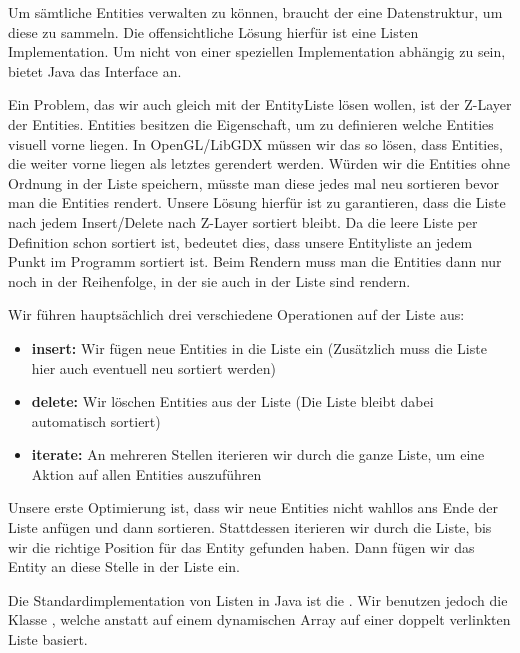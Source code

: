 Um sämtliche Entities verwalten zu können, braucht der  eine Datenstruktur, um diese zu sammeln. Die offensichtliche Lösung hierfür ist eine Listen Implementation. Um nicht von einer speziellen Implementation abhängig zu sein, bietet Java das  Interface an.

Ein Problem, das wir auch gleich mit der EntityListe lösen wollen, ist der Z-Layer der Entities. Entities besitzen die  Eigenschaft, um zu definieren welche Entities visuell vorne liegen. In OpenGL/LibGDX müssen wir das so lösen, dass Entities, die weiter vorne liegen als letztes gerendert werden. Würden wir die Entities ohne Ordnung in der Liste speichern, müsste man diese jedes mal neu sortieren bevor man die Entities rendert. 
Unsere Lösung hierfür ist zu garantieren, dass die Liste nach jedem Insert/Delete nach Z-Layer sortiert bleibt. Da die leere Liste per Definition schon sortiert ist, bedeutet dies, dass unsere Entityliste an jedem Punkt im Programm  sortiert ist. Beim Rendern muss man die Entities dann nur noch in der Reihenfolge, in der sie auch in der Liste sind rendern.

Wir führen hauptsächlich drei verschiedene Operationen auf der Liste aus:

\begin{itemize}
\item\textbf{insert:} Wir fügen neue Entities in die Liste ein (Zusätzlich muss die Liste hier auch eventuell neu sortiert werden)
\item\textbf{delete:} Wir löschen Entities aus der Liste (Die Liste bleibt dabei automatisch sortiert)
\item\textbf{iterate:} An mehreren Stellen iterieren wir durch die ganze Liste, um eine Aktion auf allen Entities auszuführen
\end{itemize}

Unsere erste Optimierung ist, dass wir neue Entities nicht wahllos ans Ende der Liste anfügen und dann sortieren. Stattdessen iterieren wir durch die Liste, bis wir die richtige Position für das Entity gefunden haben. Dann fügen wir das Entity an diese Stelle in der Liste ein.

Die Standardimplementation von Listen in Java ist die . Wir benutzen jedoch die Klasse , welche anstatt auf einem dynamischen Array auf einer doppelt verlinkten Liste basiert.

